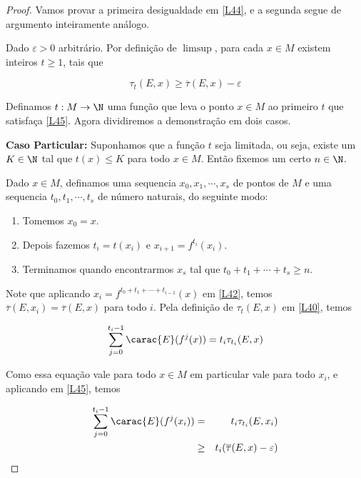 \begin{proof}
Vamos provar a primeira desigualdade em \eqref{L44}, e a segunda segue de argumento inteiramente análogo.

Dado $\varepsilon>0$ arbitrário. Por definição de $\limsup$, para cada $x\in M$ existem inteiros $t\geq 1$, tais que

\begin{equation}\label{L45}
\tau_t(E,x)\geq\overline{\tau}(E,x)-\varepsilon
\end{equation}\vspace{0.1cm}

Definamos $t:M \rightarrow \N$ uma função que leva o ponto $x\in M$ ao primeiro $t$ que satisfaça \eqref{L45}. Agora dividiremos a demonstração em dois casos.

\textbf{Caso Particular:} Suponhamos que a função $t$ seja limitada, ou seja, existe um $K\in\N$ tal que $t(x)\leq K$ para todo $x\in M$. Então fixemos um certo $n\in\N$. 

Dado $x \in M$, definamos uma sequencia $x_0,x_1,\cdots,x_s$ de pontos de $M$ e uma sequencia $t_0,t_1,\cdots,t_s$ de número naturais, do seguinte modo:

\begin{enumerate}
\item Tomemos $x_0=x$.
\item Depois fazemos $t_i=t(x_i)$ e $x_{i+1}=f^{t_i}(x_i)$.
\item Terminamos quando encontrarmos $x_s$ tal que $t_0+t_1+\cdots+t_s\geq n$.
\end{enumerate}

Note que aplicando $x_i=f^{t_0+t_1+\cdots+t_{i-1}}(x)$ em \eqref{L42}, temos $\overline{\tau}(E,x_i)=\overline{\tau}(E,x)$ para todo $i$. Pela definição de $\tau_t(E,x)$ em \eqref{L40}, temos

\begin{equation*}
\sum_{j=0}^{t_i-1}\carac{E}(f^j(x))=t_i\tau_{t_i}(E,x)
\end{equation*}\vspace{0.1cm}

Como essa equação vale para todo $x\in M$ em particular vale para todo $x_i$, e aplicando em \eqref{L45}, temos

\begin{eqnarray}
\sum_{j=0}^{t_i-1}\carac{E}(f^j(x_i)) & = &  t_i\tau_{t_i}(E,x_i)\nonumber\\
 & \geq & t_i(\overline{\tau}(E,x)-\varepsilon)\label{L46}
\end{eqnarray}\vspace{0.1cm}


\end{proof}
